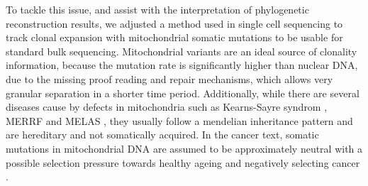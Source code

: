 To tackle this issue, and assist with the interpretation of phylogenetic reconstruction results, we adjusted a method used in single cell sequencing to track clonal expansion with mitochondrial somatic mutations \cite{Ludwig2019} to be usable for standard bulk sequencing. Mitochondrial variants are an ideal source of clonality information, because the mutation rate is significantly higher than nuclear DNA, due to the missing proof reading and repair mechanisms, which allows very granular separation in a shorter time period. Additionally, while there are several diseases cause by defects in mitochondria such as Kearns-Sayre syndrom \cite{Harvey1992}, MERRF \cite{Adam1993} and MELAS \cite{Hirano1992}, they usually follow a mendelian inheritance pattern and are hereditary and not somatically acquired. In the cancer text, somatic mutations in mitochondrial DNA are assumed to be approximately neutral with a possible selection pressure towards healthy ageing and negatively selecting cancer \cite{Rodell2013,Yuan2020}.
